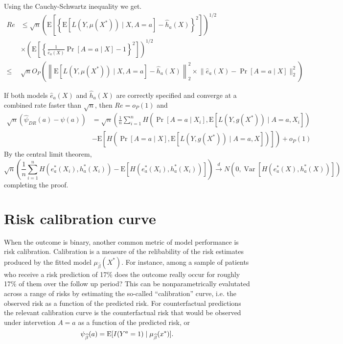 Using the Cauchy-Schwartz inequality we get.
$$
\begin{aligned}
Re & \leq \sqrt{n}\left(\mathrm{E}\left[\left\{\mathrm{E}\left[L\left(Y, \mu\left(X^*\right)\right) \mid X, A=a\right]-\widehat{h}_a(X)\right\}^2\right]\right)^{1 / 2} \\
& \times\left(\mathrm{E}\left[\left\{\frac{1}{\widehat{e}_a(X)} \operatorname{Pr}[A=a \mid X]-1\right\}^2\right]\right)^{1 / 2} \\
\leq & \sqrt{n} O_P\left(\left\|\mathrm{E}\left[L\left(Y, \mu\left(X^*\right)\right) \mid X, A=a\right]-\widehat{h}_a(X)\right\|_2^2 \times\Big\|\widehat{e}_a(X)-\operatorname{Pr}[A=a \mid X]\Big\|_2^2\right)
\end{aligned}
$$

If both models $\widehat{e}_a(X)$ and $\widehat{h}_a(X)$ are correctly specified and converge at a combined rate faster than $\sqrt{n}$, then $R e=o_P(1)$ and
$$
\begin{aligned}
\sqrt{n}\left(\widehat{\psi}_{DR}(a)-\psi(a)\right) & =\sqrt{n}\left(\frac{1}{n} \sum_{i=1}^n H\left(\operatorname{Pr}\left[A=a \mid X_i\right], \mathrm{E}\left[L\left(Y, g\left(X^*\right)\right) \mid A=a, X_i\right]\right)\right. \\
& \left.-\mathrm{E}\left[H\left(\operatorname{Pr}[A=a \mid X], \mathrm{E}\left[L\left(Y, g\left(X^*\right)\right) \mid A=a, X\right]\right)\right]\right)+o_P(1)
\end{aligned}
$$
By the central limit theorem,
$$
\sqrt{n}\left(\frac{1}{n} \sum_{i=1}^n H\left(e^*_a(X_i), h^*_a(X_i)\right)-\mathrm{E}\left[H\left(e^*_a(X_i), h^*_a(X_i)\right)\right]\right) \stackrel{d}{\longrightarrow} N\left(0, \operatorname{Var}\left[H\left(e^*_a(X), h^*_a(X)\right)\right]\right)
$$
completing the proof.

\section{Risk calibration curve}\label{sec:calib}
When the outcome is binary, another common metric of model performance is risk calibration. Calibration is a measure of the relibability of the risk estimates produced by the fitted model $\mu_{\widehat{\beta}}(X^*)$. For instance, among a sample of patients who receive a risk prediction of 17\% does the outcome really occur for roughly 17\% of them over the follow up period? This can be nonparametrically evalutated across a range of risks by estimating the so-called ``calibration'' curve, i.e. the observed risk as a function of the predicted risk. For counterfactual predictions the relevant calibration curve is the counterfactual risk that would be observed under intervetion $A=a$ as a function of the predicted risk, or
\begin{equation}\label{eqn:calib_estimand}
    \psi_{\widehat{\beta}}(a) = \operatorname{E}[I(Y^a = 1) \mid \mu_{\widehat{\beta}}(x^*)].
\end{equation}

